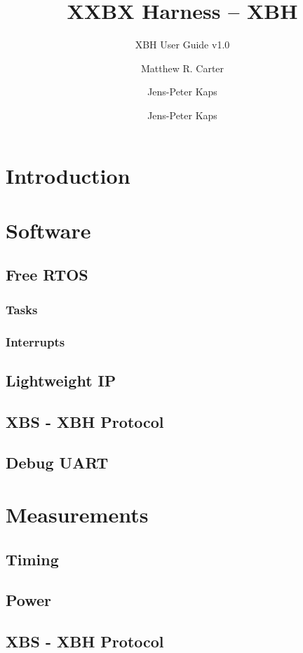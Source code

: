 \documentclass[twoside,11pt]{cergdoc}
\begin{document}
\title{XXBX Harness -- XBH}
\subtitle{XBH User Guide v1.0}
\author{Matthew R. Carter \and Jens-Peter Kaps}
\author{Jens-Peter Kaps}

\maketitle

\tableofcontents

\chapter{Introduction}
\chapter{Software}
  \section{Free RTOS}
    \subsection{Tasks}
    \subsection{Interrupts}
  \section{Lightweight IP}
  \section{XBS - XBH Protocol}
  \section{Debug UART}
\chapter{Measurements}
  \section{Timing}
  \section{Power}

\begin{appendix}
\chapter{XBS - XBH Protocol}
\end{appendix}
\end{document}
